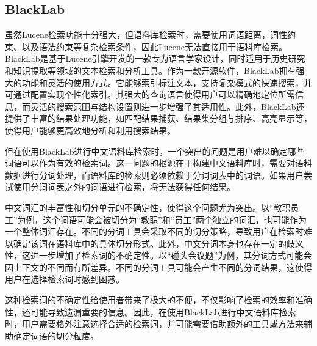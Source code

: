 \documentclass[11pt]{article}
\begin{document}
\begin{CJK*}{UTF8}{gbsn}
\subsection{BlackLab}

虽然Lucene检索功能十分强大，但语料库检索时，需要使用词语距离，词性约束、以及语法约束等复杂检索条件，因此Lucene无法直接用于语料库检索。BlackLab是基于Lucene引擎开发的一款专为语言学家设计，同时适用于历史研究和知识提取等领域的文本检索和分析工具。作为一款开源软件，BlackLab拥有强大的功能和灵活的使用方式。它能够索引标注文本，支持复杂模式的快速搜索，并可通过配置实现个性化索引。其强大的查询语言使得用户可以精确地定位所需信息，而灵活的搜索范围与结构设置则进一步增强了其适用性。此外，BlackLab还提供了丰富的结果处理功能，如匹配结果捕获、结果集分组与排序、高亮显示等，使得用户能够更高效地分析和利用搜索结果。


但在使用BlackLab进行中文语料库检索时，一个突出的问题是用户难以确定哪些词语可以作为有效的检索词。这一问题的根源在于构建中文语料库时，需要对语料数据进行分词处理，而语料库的检索则必须依赖于分词词表中的词语。如果用户尝试使用分词词表之外的词语进行检索，将无法获得任何结果。

中文词汇的丰富性和切分单元的不确定性，使得这个问题尤为突出。以“教职员工”为例，这个词语可能会被切分为“教职”和“员工”两个独立的词汇，也可能作为一个整体词汇存在。不同的分词工具会采取不同的切分策略，导致用户在检索时难以确定该词在语料库中的具体切分形式。此外，中文分词本身也存在一定的歧义性，这进一步增加了检索词的不确定性。以“碰头会议题”为例，其分词方式可能会因上下文的不同而有所差异。不同的分词工具可能会产生不同的分词结果，这使得用户在选择检索词时感到困惑。

这种检索词的不确定性给使用者带来了极大的不便，不仅影响了检索的效率和准确性，还可能导致遗漏重要的信息。因此，在使用BlackLab进行中文语料库检索时，用户需要格外注意选择合适的检索词，并可能需要借助额外的工具或方法来辅助确定词语的切分粒度。


\end{CJK*}
\end{document}
